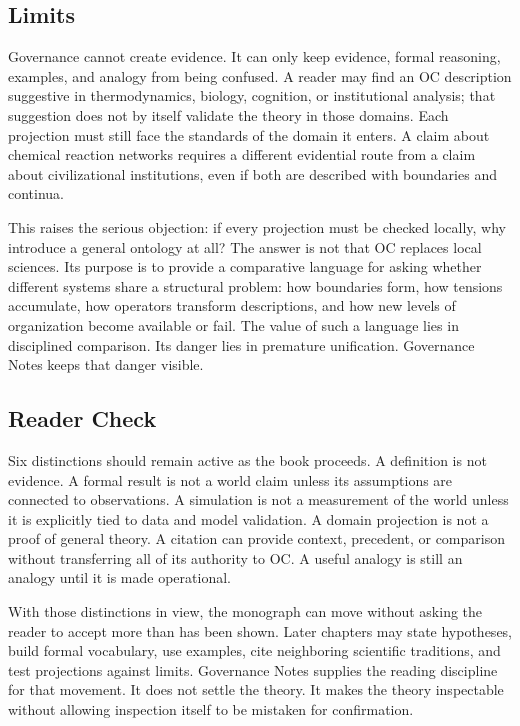 \documentclass[11pt,a4paper,openany]{book}
\begin{document}
\subsection{Limits}
Governance cannot create evidence. It can only keep evidence, formal reasoning, examples, and analogy from being confused. A reader may find an OC description suggestive in thermodynamics, biology, cognition, or institutional analysis; that suggestion does not by itself validate the theory in those domains. Each projection must still face the standards of the domain it enters. A claim about chemical reaction networks requires a different evidential route from a claim about civilizational institutions, even if both are described with boundaries and continua. \cite{nicolis_prigogine_selforg,kauffman_autocatalytic}\par
This raises the serious objection: if every projection must be checked locally, why introduce a general ontology at all? The answer is not that OC replaces local sciences. Its purpose is to provide a comparative language for asking whether different systems share a structural problem: how boundaries form, how tensions accumulate, how operators transform descriptions, and how new levels of organization become available or fail. The value of such a language lies in disciplined comparison. Its danger lies in premature unification. Governance Notes keeps that danger visible.\par
\subsection{Reader Check}
Six distinctions should remain active as the book proceeds. A definition is not evidence. A formal result is not a world claim unless its assumptions are connected to observations. A simulation is not a measurement of the world unless it is explicitly tied to data and model validation. A domain projection is not a proof of general theory. A citation can provide context, precedent, or comparison without transferring all of its authority to OC. A useful analogy is still an analogy until it is made operational. \cite{nicolis_prigogine_selforg,kauffman_autocatalytic}\par
With those distinctions in view, the monograph can move without asking the reader to accept more than has been shown. Later chapters may state hypotheses, build formal vocabulary, use examples, cite neighboring scientific traditions, and test projections against limits. Governance Notes supplies the reading discipline for that movement. It does not settle the theory. It makes the theory inspectable without allowing inspection itself to be mistaken for confirmation.\par
\end{document}

